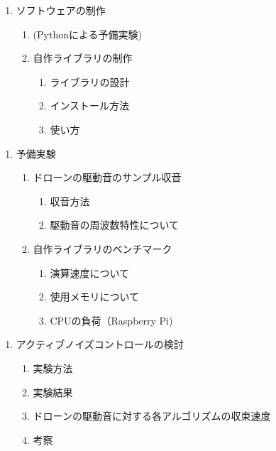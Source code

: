 \documentclass[
  9pt
]{jsarticle}
\providecommand{\tightlist}{%
  \setlength{\itemsep}{0pt}\setlength{\parskip}{0pt}}
\begin{document}
\begin{enumerate}
\def\labelenumi{\arabic{enumi}.}
\setcounter{enumi}{3}
\tightlist
\item
  ソフトウェアの制作

  \begin{enumerate}
  \def\labelenumii{\arabic{enumii}.}
  \tightlist
  \item
    (Pythonによる予備実験)
  \item
    自作ライブラリの制作

    \begin{enumerate}
    \def\labelenumiii{\arabic{enumiii}.}
    \tightlist
    \item
      ライブラリの設計
    \item
      インストール方法
    \item
      使い方
    \end{enumerate}
  \end{enumerate}
\end{enumerate}

\begin{enumerate}
\def\labelenumi{\arabic{enumi}.}
\setcounter{enumi}{4}
\tightlist
\item
  予備実験

  \begin{enumerate}
  \def\labelenumii{\arabic{enumii}.}
  \tightlist
  \item
    ドローンの駆動音のサンプル収音

    \begin{enumerate}
    \def\labelenumiii{\arabic{enumiii}.}
    \tightlist
    \item
      収音方法
    \item
      駆動音の周波数特性について
    \end{enumerate}
  \item
    自作ライブラリのベンチマーク

    \begin{enumerate}
    \def\labelenumiii{\arabic{enumiii}.}
    \tightlist
    \item
      演算速度について
    \item
      使用メモリについて
    \item
      CPUの負荷（Raspberry Pi)
    \end{enumerate}
  \end{enumerate}
\end{enumerate}

\begin{enumerate}
\def\labelenumi{\arabic{enumi}.}
\setcounter{enumi}{5}
\tightlist
\item
  アクティブノイズコントロールの検討

  \begin{enumerate}
  \def\labelenumii{\arabic{enumii}.}
  \tightlist
  \item
    実験方法
  \item
    実験結果
  \item
    ドローンの駆動音に対する各アルゴリズムの収束速度
  \item
    考察
  \end{enumerate}
\end{enumerate}
\end{document}
